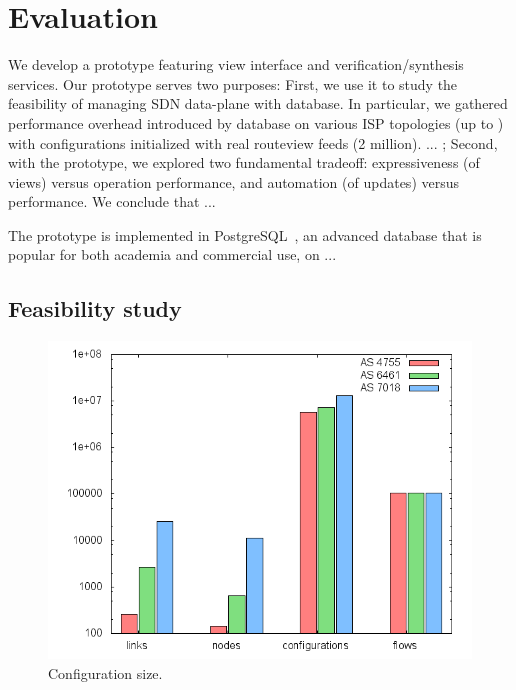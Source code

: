 \section{Evaluation}
\label{sec:eval}


We develop a prototype featuring view interface and
verification/synthesis services. Our prototype serves two purposes:
First, we use it to study the feasibility of managing SDN data-plane
with database. In particular, we gathered performance overhead
introduced by database on various ISP topologies (up to ) with
configurations initialized with real routeview feeds (2
million). ... ; Second, with the prototype, we explored two
fundamental tradeoff: expressiveness (of views) versus operation
performance, and automation (of updates) versus performance. We
conclude that ...

The prototype is implemented in PostgreSQL~\cite{postgres}, an
advanced database that is popular for both academia and commercial
use, on ... %

\subsection{Feasibility study}

\begin{figure}
  \centering
  \includegraphics[width=1\linewidth]{figures/init.png}
  \caption{Configuration size.}
  \label{fig:init}
\end{figure}

